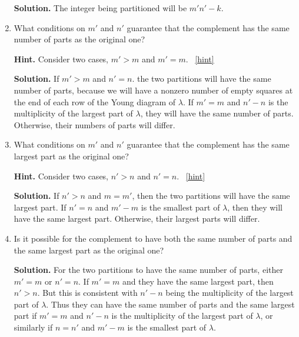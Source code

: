 \documentclass{book}
\begin{document}
\begin{activity}[]
\begin{enumerate}[font=\bfseries,label=(\alph*),ref=\alph*]
\noindent\textbf{Solution.}\hypertarget{solution-217}{}\quad%
\hypertarget{p-1561}{}%
The integer being partitioned will be \(m'n'-k\).%
\item\label{task-268} \hypertarget{p-1562}{}%
What conditions on \(m'\) and \(n'\) guarantee that the complement has the same number of parts as the original one?%
\par\smallskip%
\noindent\textbf{Hint.}\hypertarget{hint-194}{}\quad%
\hypertarget{p-1563}{}%
Consider two cases, \(m' \gt m\) and \(m' = m\).%
~\hfill{\tiny\hyperlink{a-308.c}{[hint]}\hypertarget{q-308.c}{}}\par\smallskip%
\noindent\textbf{Solution.}\hypertarget{solution-218}{}\quad%
\hypertarget{p-1564}{}%
If \(m'>m\) and \(n'=n\). the two partitions will have the same number of parts, because we will have a nonzero number of empty squares at the end of each row of the Young diagram of \(\lambda\). If \(m'=m\) and \(n'-n\) is the multiplicity of the largest part of \(\lambda\), they will have the same number of parts. Otherwise, their numbers of parts will differ.%
\item\label{task-269} \hypertarget{p-1565}{}%
What conditions on \(m'\) and \(n'\) guarantee that the complement has the same largest part as the original one?%
\par\smallskip%
\noindent\textbf{Hint.}\hypertarget{hint-195}{}\quad%
\hypertarget{p-1566}{}%
Consider two cases, \(n' \gt n\) and \(n' = n\).%
~\hfill{\tiny\hyperlink{a-308.d}{[hint]}\hypertarget{q-308.d}{}}\par\smallskip%
\noindent\textbf{Solution.}\hypertarget{solution-219}{}\quad%
\hypertarget{p-1567}{}%
If \(n'\gt n\) and \(m=m'\), then the two partitions will have the same largest part. If \(n'=n\) and \(m'-m\) is the smallest part of \(\lambda\), then they will have the same largest part. Otherwise, their largest parts will differ.%
\item\label{task-270} \hypertarget{p-1568}{}%
Is it possible for the complement to have both the same number of parts and the same largest part as the original one?%
\par\smallskip%
\noindent\textbf{Solution.}\hypertarget{solution-220}{}\quad%
\hypertarget{p-1569}{}%
For the two partitions to have the same number of parts, either \(m'=m\) or \(n'=n\). If \(m'=m\) and they have the same largest part, then \(n'>n\). But this is consistent with \(n'-n\) being the multiplicity of the largest part of \(\lambda\). Thus they can have the same number of parts and the same largest part if \(m'=m\) and \(n'-n\) is the multiplicity of the largest part of \(\lambda\), or similarly if \(n=n'\) and \(m'-m\) is the smallest part of \(\lambda\).%

\end{enumerate}
\end{activity}
\end{document}
